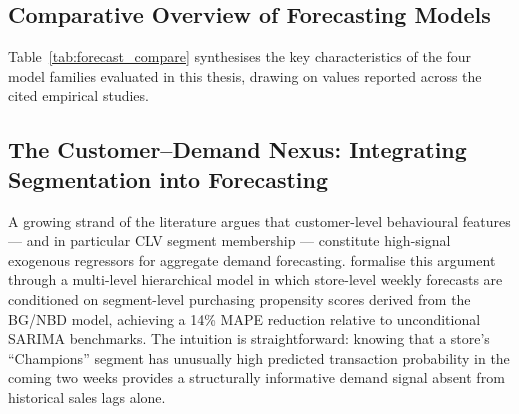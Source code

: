 \subsection{Comparative Overview of Forecasting Models}

Table~\ref{tab:forecast_compare} synthesises the key characteristics of the four model families evaluated in this thesis, drawing on values reported across the cited empirical studies.

\begin{table}[H]
\centering
\caption{Comparative Overview of Demand Forecasting Models Relevant to Retail Contexts}
\label{tab:forecast_compare}
\end{table}

\subsection{The Customer--Demand Nexus: Integrating Segmentation into Forecasting}

A growing strand of the literature argues that customer-level behavioural features — and in particular CLV segment membership — constitute high-signal exogenous regressors for aggregate demand forecasting. \cite{preprints2026} formalise this argument through a multi-level hierarchical model in which store-level weekly forecasts are conditioned on segment-level purchasing propensity scores derived from the BG/NBD model, achieving a 14\% MAPE reduction relative to unconditional SARIMA benchmarks. The intuition is straightforward: knowing that a store's ``Champions'' segment has unusually high predicted transaction probability in the coming two weeks provides a structurally informative demand signal absent from historical sales lags alone.

